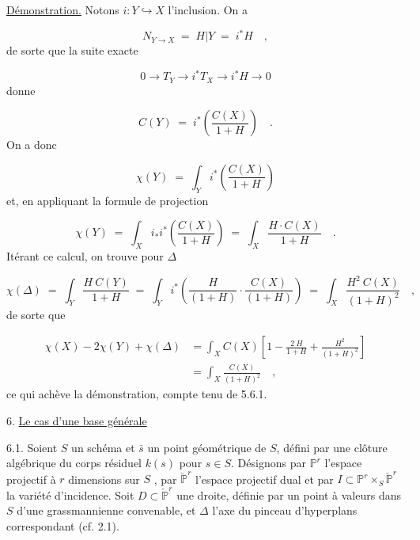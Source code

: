 \underline{Démonstration.} \quad Notons $i : Y \hookrightarrow X$ l'inclusion. On a

\begin{equation*}
N_{Y \longrightarrow X} \;=\; H|Y \;=\; i^{*}H \quad ,
\end{equation*}
de sorte que la suite exacte

\begin{equation*}
0 \longrightarrow T_Y \longrightarrow i^{*}T_X \longrightarrow i^{*}H \longrightarrow 0
\end{equation*}
donne

\begin{equation}\tag{5.7.4}
C(Y) \;=\; i^{*} \left( \frac{C(X)}{1+H} \right) \quad .
\end{equation}
On a donc

\begin{equation*}
\chi(Y) \;=\; \int_Y i^{*} \left( \frac{C(X)}{1+H} \right)
\end{equation*}
et, en appliquant la formule de projection

\begin{equation}\tag{5.7.5}
\chi(Y) \;=\; \int_X i_{*}i^{*} \left( \frac{C(X)}{1+H} \right) \;=\; \int_X \frac{H \cdot C(X)}{1 + H} \quad .
\end{equation}
Itérant ce calcul, on trouve pour $\Delta$

\begin{equation}\tag{5.7.6}
\chi(\Delta) \;=\; \int_Y \frac{H\ C(Y)}{1 + H} \;=\; \int_Y i^{*} \left( \frac{H}{(1+H)} \cdot \frac{C(X)}{(1+H)} \right) \;=\; \int_X \frac{H^2\ C(X)}{(1+H)^2} \quad ,
\end{equation}
de sorte que

\begin{equation*}
\begin{aligned} \chi(X) - 2\chi(Y)+\chi(\Delta) &= \int_X C(X) \left[ 1 - \frac{2\ H}{1+H} + \frac{H^2}{(1+H)^2} \right] \\ &= \int_X \frac{C(X)}{(1 + H)^2} \quad , \end{aligned}
\end{equation*}
ce qui achève la démonstration, compte tenu de 5.6.1.




6. \underline{Le cas d'une base générale}

6.1. Soient $S$ un schéma et $\bar{s}$ un point géométrique de $S$, défini par une clôture algébrique du corps résiduel $k(s)$ pour $s \in S$. Désignons par $\mathbb{P}^r$ l'espace projectif à $r$ dimensions sur $S$ , par $\check{\mathbb{P}}^r$ l'espace projectif dual et par $I \subset \mathbb{P}^r \times_S \check{\mathbb{P}}^r$ la variété d'incidence. Soit $D \subset \check{\mathbb{P}}^r$ une droite, définie par un point à valeurs dans $S$ d'une grassmannienne convenable, et $\Delta$ l'axe du pinceau d'hyperplans correspondant (cf. 2.1).

